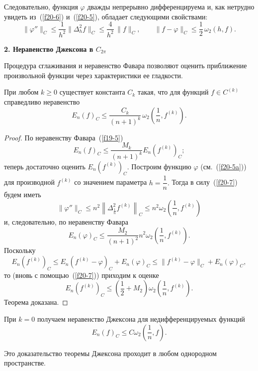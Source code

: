 Следовательно, функция $\varphi$ дважды непрерывно дифференцируема и, как нетрудно
увидеть из~(\ref{f20-6}) и~(\ref{f20-5}), обладает следующими свойствами:
 \begin{equation}\label{f20-7}
 \|\varphi''\|_C\le \frac{1}{h^2} \|\Delta_h^2 f\|_C\le\frac{4}{h^2}\,\|f\|_C,\qquad
 \|f-\varphi\|_C\le \frac{1}{2}\,\omega_2(h,f).
 \end{equation}

 \vspace{3mm}
 {\bf 2. Неравенство Джексона в ${C_{2\pi}}$}
 \vspace{3mm}

 Процедура сглаживания  и неравенство Фавара позволяют
 оценить приближение произвольной функции через характеристики ее гладкости.

 \begin{teo}[Д.\,Джексон]
 При любом $k\ge 0$ существует константа $C_k$ такая, что для функций
 $f\in {C}^{(k)}$ справедливо неравенство
  $$
 E_n(f)_C\le \frac{C_k}{(n+1)^k}\, \omega_2\left(
 \frac{1}{n},f^{(k)}\right).
 $$
 \end{teo}

 \begin{proof} %
 По неравенству Фавара~(\ref{f19-5})
 $$
 E_n(f)_C\le \frac{M_k}{(n+1)^k} E_n(f^{(k)})_C;
 $$
 теперь достаточно оценить $E_n(f^{(k)})_C.$ Построим  функцию   $\varphi$  (см.~(\ref{f20-5a}))
 для производной $f^{(k)}$ со значением параметра  $h=\dfrac{1}{n}.$
 Тогда  в силу~(\ref{f20-7}) будем иметь
 $$
 \|\varphi''\|_C\le  n^2
 \left\| \Delta_{\frac{1}{n}}^2 f^{(k)}\right\|_C\le
  n^2\omega_2\left( \frac{1}{n},f^{(k)}\right)
 $$
 и, следовательно, по неравенству Фавара
 $$
 E_n(\varphi)_C\le \frac{M_2}{(n+1)^2} n^2\omega_2
 \left( \frac{1}{n},f^{(k)}\right).
 $$
 Поскольку
 $$
 E_n(f^{(k)})_C\le E_n(f^{(k)}-\varphi)_C+E_n(\varphi)_C\le \|f^{(k)}-\varphi\|_C+E_n(\varphi)_C,
 $$
 то (вновь с помощью~(\ref{f20-7})) приходим к оценке
  $$
 E_n(f^{(k)})_C\le \left(\frac{1}{2}+M_2\right) \omega_2
 \left( \frac{1}{n},f^{(k)}\right).
 $$
 Теорема доказана.
 \end{proof}

 При $k=0$ получаем   неравенство Джексона для недифференцируемых функций
 $$
 E_n(f)_C\le C\omega_2\left( \frac{1}{n},f\right).
 $$

 \begin{Remark} %
 Это доказательство теоремы Джексона проходит в любом однородном пространстве.
 \end{Remark}
